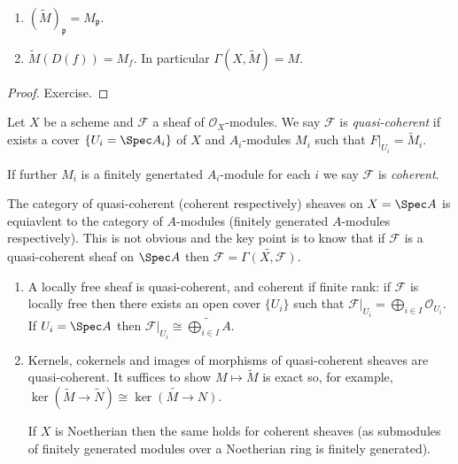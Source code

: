 \documentclass[a4paper]{article}
\newcommand{\sh}[1]{\mathcal{#1}} %
\begin{document}
\begin{proposition}\leavevmode
  \begin{enumerate}
  \item \((\widetilde M)_{\mathfrak p} = M_{\mathfrak p}\).
  \item \(\widetilde M(D(f)) = M_f\). In particular \(\Gamma(X, \widetilde M) = M\).
  \end{enumerate}
\end{proposition}

\begin{proof}
  Exercise.
\end{proof}

\begin{definition}
  Let \(X\) be a scheme and \(\sh F\) a sheaf of \(\sh O_X\)-modules. We say \(\sh F\) is \emph{quasi-coherent} if exists a cover \(\{U_i = \Spec A_i\}\) of \(X\) and \(A_i\)-modules \(M_i\) such that \(F|_{U_i} = \widetilde M_i\).

  If further \(M_i\) is a finitely genertated \(A_i\)-module for each \(i\) we say \(\sh F\) is \emph{coherent}.
\end{definition}

\begin{remark}
  The category of quasi-coherent (coherent respectively) sheaves on \(X = \Spec A\) is equiavlent to the category of \(A\)-modules (finitely generated \(A\)-modules respectively). This is not obvious and the key point is to know that if \(\sh F\) is a quasi-coherent sheaf on \(\Spec A\) then \(\sh F = \widetilde{\Gamma(X, \sh F)}\).
\end{remark}

\begin{eg}\leavevmode
  \begin{enumerate}
  \item A locally free sheaf is quasi-coherent, and coherent if finite rank: if \(\sh F\) is locally free then there exists an open cover \(\{U_i\}\) such that \(\sh F|_{U_i} = \bigoplus_{i \in I} \sh O_{U_i}\). If \(U_i = \Spec A\) then \(\sh F|_{U_i} \cong \widetilde{\bigoplus_{i \in I} A}\).
  \item Kernels, cokernels and images of morphisms of quasi-coherent sheaves are quasi-coherent. It suffices to show \(M \mapsto \widetilde M\) is exact so, for example, \(\ker(\widetilde M \to \widetilde N) \cong \widetilde{\ker(M \to N)}\).

    If \(X\) is Noetherian then the same holds for coherent sheaves (as submodules of finitely generated modules over a Noetherian ring is finitely generated).
  \end{enumerate}
\end{eg}
\end{document}
